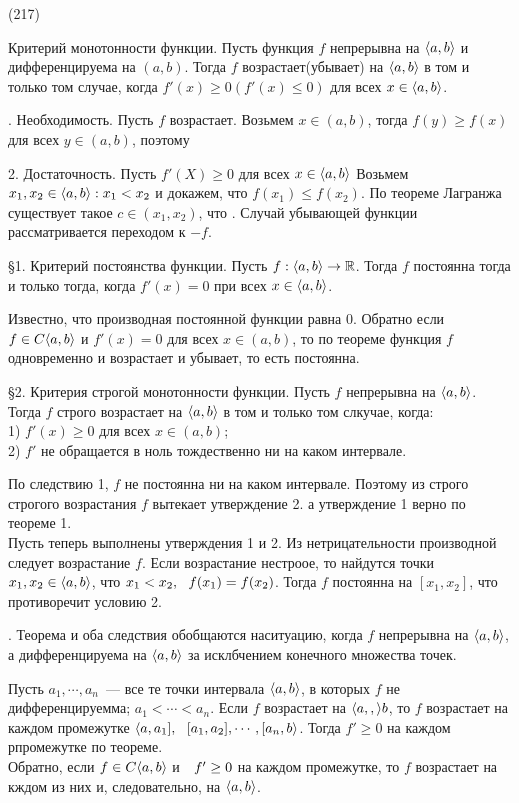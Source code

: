 (217)

\T \q Критерий монотонности функции. Пусть функция $f$ непрерывна на $\langle a, b \rangle$ и дифференцируема на $(a, b)$. Тогда $f$ возрастает(убывает) на $\langle a, b \rangle$ в том и только том случае, когда $f'(x) \ge 0 (f'(x) \le 0)$ для всех $x \in \langle a, b \rangle$.

. Необходимость. Пусть $f$ возрастает. Возьмем $x\in (a, b)$, тогда $f(y)\ge f(x)$ для всех $y \in (a, b)$, поэтому 

2. Достаточность. Пусть $f'(X) \ge 0$ для всех $x \in \langle a, b \rangle$ Возьмем $x_1, x_2 \in \langle a, b \rangle: x_1 < x_2$ и докажем, что $f(x_1) \le f(x_2)$. По теореме Лагранжа существует такое $c \in (x_1, x_2)$, что .
Случай убывающей функции рассматривается переходом к $-f$.

\S1. \q Критерий постоянства функции. Пусть $f: \langle a, b \rangle\to \mathbb{R}$. Тогда $f$ постоянна тогда и только тогда, когда $f'(x) = 0$ при всех $x \in \langle a, b \rangle$.

\D Известно, что производная постоянной функции равна 0. Обратно если $f \in C\langle a, b \rangle$ и $f'(x) = 0$ для всех $x \in (a, b)$, то по теореме функция $f$ одновременно и возрастает и убывает, то есть постоянна.

\S2. \q Критерия строгой монотонности функции. Пусть $f$ непрерывна на $\langle a, b \rangle$. Тогда $f$ строго возрастает на $\langle a, b \rangle$ в том и только том слкучае, когда:\\
1) $f'(x) \ge 0$ для всех $x\in (a, b)$;\\
2) $f'$ не обращается в ноль тождественно ни на каком интервале.

\D По следствию 1, $f$ не постоянна ни на каком интервале. Поэтому из строго строгого возрастания $f$ вытекает утверждение 2. а утверждение 1 верно по теореме 1.\\
Пусть теперь выполнены утверждения 1 и 2. Из нетрицательности производной следует возрастание $f$. Если возрастание нестроое, то найдутся точки $x_1, x_2 \in \langle a, b \rangle$, что $x_ 1 < x_2,\ \  f(x_1) = f(x_2)$. Тогда $f$ постоянна на $[x_1, x_2]$, что противоречит условию 2.

\Zam. Теорема и оба следствия обобщаются наситуацию, когда $f$ непрерывна на $\langle a, b \rangle$, а дифференцируема на $\langle a, b \rangle$ за исклбчением конечного множества точек.

\D Пусть $a_1,\cdots, a_n$~--- все те точки интервала $\langle a, b \rangle$, в которых $f$ не дифференцируемма; $a_1 < \cdots < a_n$. Если $f$ возрастает на $\langle a, , \rangle b$, то $f$ возрастает на каждом промежутке $\langle a, a_1],\ \  [a_1, a_2],\cdots,[a_n, b\rangle$. Тогда $f'\ge 0$ на каждом рпромежутке по теореме.\\
Обратно, если $f \in C\langle a, b \rangle$ и $\ \  f' \ge 0$ на каждом промежутке, то $f$ возрастает на кждом из них и, следовательно, на $\langle a, b \rangle$.